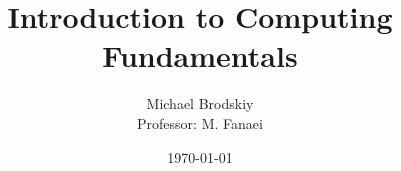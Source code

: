 


\title{Introduction to Computing Fundamentals}
\date{\today}
\author{Michael Brodskiy\\ \small Professor: M. Fanaei}



\maketitle


